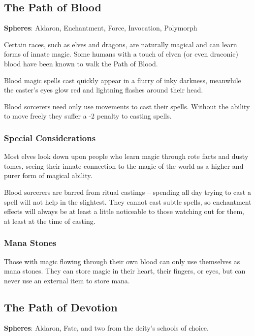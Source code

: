 \begin{multicols}{2}
\subsection{The Path of Blood}

\textbf{Spheres}: Aldaron, Enchantment, Force, Invocation, Polymorph

\noindent Certain races, such as elves and dragons, are naturally magical and can learn forms of innate magic. Some humans with a touch of elven (or even draconic) blood have been known to walk the Path of Blood.

Blood magic spells cast quickly appear in a flurry of inky darkness, meanwhile the caster's eyes glow red and lightning flashes around their head.

Blood sorcerers need only use movements to cast their spells. Without the ability to move freely they suffer a -2 penalty to casting spells.

\subsubsection{Special Considerations}

Most elves look down upon people who learn magic through rote facts and dusty tomes, seeing their innate connection to the magic of the world as a higher and purer form of magical ability.

Blood sorcerers are barred from ritual castings -- spending all day trying to cast a spell will not help in the slightest. They cannot cast subtle spells, so enchantment effects will always be at least a little noticeable to those watching out for them, at least at the time of casting.

\subsubsection{Mana Stones}

Those with magic flowing through their own blood can only use themselves as mana stones.
They can store magic in their heart, their fingers, or eyes, but can never use an external item to store mana.

\subsection{The Path of Devotion}

\textbf{Spheres}: Aldaron, Fate, and two from the deity's schools of choice.


\end{multicols}

